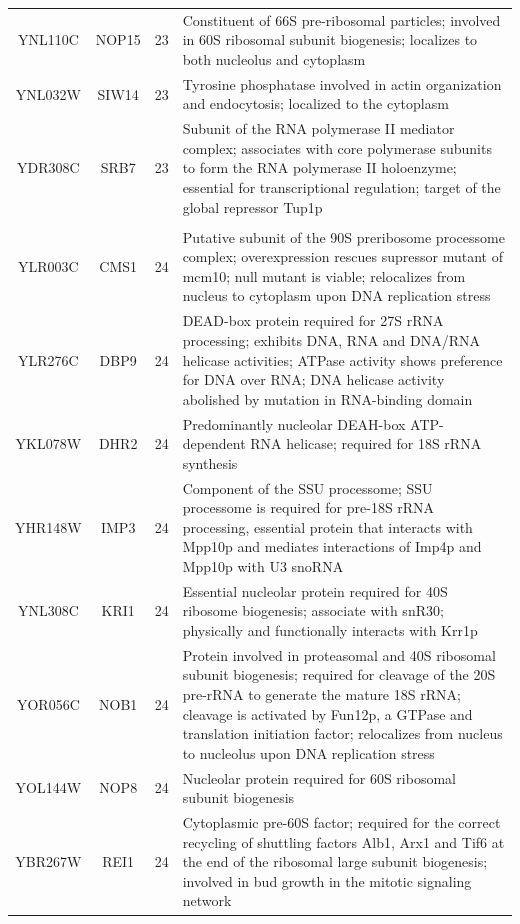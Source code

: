 \documentclass[]{article}
\begin{document}
\begin{longtable}{@{\extracolsep{3pt}} cccp{85mm}}
YNL110C & NOP15 & 23 & Constituent of 66S pre-ribosomal particles; involved in 60S ribosomal subunit biogenesis; localizes to both nucleolus and cytoplasm \\ 
YNL032W & SIW14 & 23 & Tyrosine phosphatase involved in actin organization and endocytosis; localized to the cytoplasm \\ 
YDR308C & SRB7 & 23 & Subunit of the RNA polymerase II mediator complex; associates with core polymerase subunits to form the RNA polymerase II holoenzyme; essential for transcriptional regulation; target of the global repressor Tup1p \\   \hline \\ [-1.8ex] 
YLR003C & CMS1 & 24 & Putative subunit of the 90S preribosome processome complex; overexpression rescues supressor mutant of mcm10; null mutant is viable; relocalizes from nucleus to cytoplasm upon DNA replication stress \\ 
YLR276C & DBP9 & 24 & DEAD-box protein required for 27S rRNA processing; exhibits DNA, RNA and DNA/RNA helicase activities; ATPase activity shows preference for DNA over RNA; DNA helicase activity abolished by mutation in RNA-binding domain \\ 
YKL078W & DHR2 & 24 & Predominantly nucleolar DEAH-box ATP-dependent RNA helicase; required for 18S rRNA synthesis \\ 
YHR148W & IMP3 & 24 & Component of the SSU processome; SSU processome is required for pre-18S rRNA processing, essential protein that interacts with Mpp10p and mediates interactions of Imp4p and Mpp10p with U3 snoRNA \\ 
YNL308C & KRI1 & 24 & Essential nucleolar protein required for 40S ribosome biogenesis; associate with snR30; physically and functionally interacts with Krr1p \\ 
YOR056C & NOB1 & 24 & Protein involved in proteasomal and 40S ribosomal subunit biogenesis; required for cleavage of the 20S pre-rRNA to generate the mature 18S rRNA; cleavage is activated by Fun12p, a GTPase and translation initiation factor; relocalizes from nucleus to nucleolus upon DNA replication stress \\ 
YOL144W & NOP8 & 24 & Nucleolar protein required for 60S ribosomal subunit biogenesis \\ 
YBR267W & REI1 & 24 & Cytoplasmic pre-60S factor; required for the correct recycling of shuttling factors Alb1, Arx1 and Tif6 at the end of the ribosomal large subunit biogenesis; involved in bud growth in the mitotic signaling network \\ 

\end{longtable}
\end{document}
